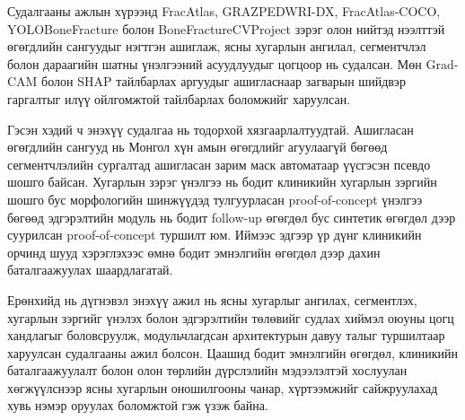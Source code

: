 Судалгааны ажлын хүрээнд FracAtlas, GRAZPEDWRI-DX, FracAtlas-COCO, YOLOBoneFracture болон BoneFractureCVProject зэрэг олон нийтэд нээлттэй өгөгдлийн сангуудыг нэгтгэн ашиглаж, ясны хугарлын ангилал, сегментчлэл болон дараагийн шатны үнэлгээний асуудлуудыг цогцоор нь судалсан. Мөн Grad-CAM болон SHAP тайлбарлах аргуудыг ашигласнаар загварын шийдвэр гаргалтыг илүү ойлгомжтой тайлбарлах боломжийг харуулсан.

Гэсэн хэдий ч энэхүү судалгаа нь тодорхой хязгаарлалтуудтай. Ашигласан өгөгдлийн сангууд нь Монгол хүн амын өгөгдлийг агуулаагүй бөгөөд сегментчлэлийн сургалтад ашигласан зарим маск автоматаар үүсгэсэн псевдо шошго байсан. Хугарлын зэрэг үнэлгээ нь бодит клиникийн хугарлын зэргийн шошго бус морфологийн шинжүүдэд тулгуурласан proof-of-concept үнэлгээ бөгөөд эдгэрэлтийн модуль нь бодит follow-up өгөгдөл бус синтетик өгөгдөл дээр суурилсан proof-of-concept туршилт юм. Иймээс эдгээр үр дүнг клиникийн орчинд шууд хэрэглэхээс өмнө бодит эмнэлгийн өгөгдөл дээр дахин баталгаажуулах шаардлагатай.

Ерөнхийд нь дүгнэвэл энэхүү ажил нь ясны хугарлыг ангилах, сегментлэх, хугарлын зэргийг үнэлэх болон эдгэрэлтийн төлөвийг судлах хиймэл оюуны цогц хандлагыг боловсруулж, модульчлагдсан архитектурын давуу талыг туршилтаар харуулсан судалгааны ажил болсон. Цаашид бодит эмнэлгийн өгөгдөл, клиникийн баталгаажуулалт болон олон төрлийн дүрслэлийн мэдээлэлтэй хослуулан хөгжүүлснээр ясны хугарлын оношилгооны чанар, хүртээмжийг сайжруулахад хувь нэмэр оруулах боломжтой гэж үзэж байна.
